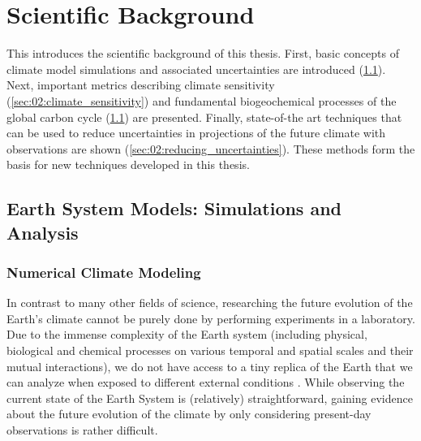 


\chapter{Scientific Background}
\label{ch:02:scientific_background}

This  introduces the scientific
background of this thesis. First, basic concepts of climate model simulations
and associated uncertainties are introduced (\cref{sec:02:esms}). Next,
important metrics describing climate sensitivity
(\cref{sec:02:climate_sensitivity}) and fundamental biogeochemical processes of
the global carbon cycle (\cref{sec:02:esms}) are presented. Finally,
state-of-the art techniques that can be used to reduce uncertainties in
projections of the future climate with observations are shown
(\cref{sec:02:reducing_uncertainties}). These methods form the basis for new
techniques developed in this thesis.


\section{Earth System Models: Simulations and Analysis}
\label{sec:02:esms}


\subsection{Numerical Climate Modeling}
\label{subsec:02:numerical_climate_modeling}

In contrast to many other fields of science, researching the future evolution
of the Earth's climate cannot be purely done by performing experiments in a
laboratory. Due to the immense complexity of the Earth system (including
physical, biological and chemical processes on various temporal and spatial
scales and their mutual interactions), we do not have access to a tiny replica
of the Earth that we can analyze when exposed to different external conditions
\autocite{Flato2011}. While observing the current state of the Earth System is
(relatively) straightforward, gaining evidence about the future evolution of
the climate by only considering present-day observations is rather difficult.

